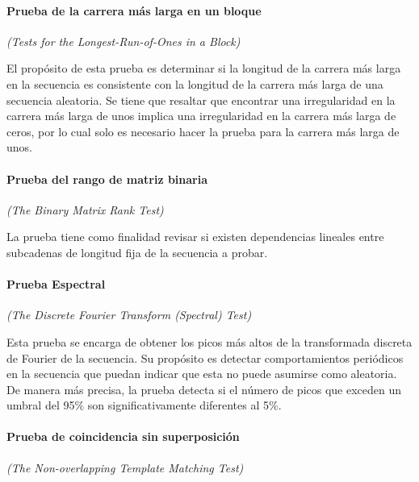 

\paragraph{Prueba de la carrera más larga en un bloque} %
\textit{(Tests for the Longest-Run-of-Ones in a Block)}

El propósito de esta prueba es determinar si la longitud de la carrera más
larga en la secuencia es consistente con la longitud de la carrera más larga
de una secuencia aleatoria. Se tiene que resaltar que encontrar una
irregularidad en la carrera más larga de unos implica una irregularidad en
la carrera más larga de ceros, por lo cual solo es necesario hacer la prueba
para la carrera más larga de unos.

\paragraph{Prueba del rango de matriz binaria} %
\textit{(The Binary Matrix Rank Test)}


La prueba tiene como finalidad revisar si existen dependencias lineales entre
subcadenas de longitud fija de la secuencia a probar.

\paragraph{Prueba Espectral} %
\textit{(The Discrete Fourier Transform (Spectral) Test)}

Esta prueba se encarga de obtener los picos más altos de la transformada
discreta de Fourier de la secuencia. Su propósito es detectar comportamientos
periódicos en la secuencia que puedan indicar que esta no puede asumirse como
aleatoria. De manera más precisa, la prueba detecta si el número de picos que
exceden un umbral del 95\% son significativamente diferentes al 5\%.

\paragraph{Prueba de coincidencia sin superposición} %
\textit{(The Non-overlapping Template Matching Test)}

